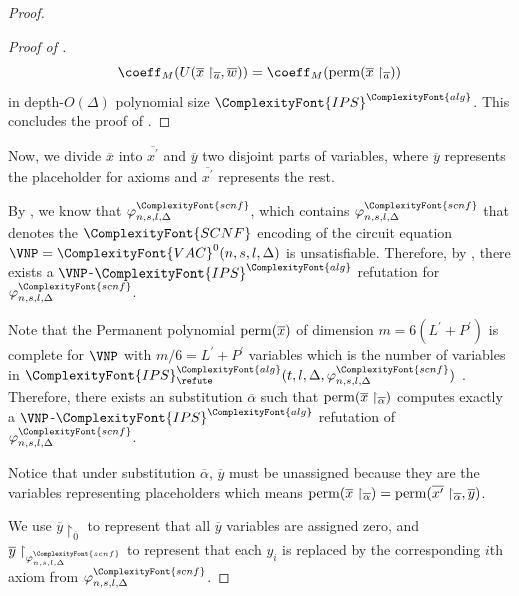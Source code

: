 \documentclass[11pt,letter]{article}
\theoremstyle{remark} %
\newcommand{\perm}{{\rm perm}}
\newcommand{\alg}{\ComplexityFont{alg}}
\newcommand{\IPS}{%
    {
        \ComplexityFont{IPS} 
    }
}
\newcommand{\SCNF}{%
    {
        \ComplexityFont{SCNF}
    }
}
\newcommand{\scnf}{
    {
        \ComplexityFont{scnf}
    }
}
\newcommand{\VAC}{
    {
        \ComplexityFont{VAC}
    }
}
\begin{document}
{\begin{proof}
\begin{proof}[Proof of ]
        \begin{equation}
            \label{equa: final circuit equation}
            \coeff_M(U(\overline{x}\restriction_{\overline{a}}, \overline{w})) = \coeff_M(\perm(\overline{x}\restriction_{\overline{a}}))
        \end{equation}
        in depth-$O(\Delta)$ polynomial size $\IPS^\alg$. This concludes the proof of .
    \end{proof}
    
        \bigskip
        Now, we divide $\overline{x}$ into $\overline{x^\prime}$ and $\overline{y}$ two disjoint parts of variables, where $\overline{y}$ represents the placeholder for axioms and $\overline{x^\prime}$ represents the rest. 
        
        By , we know that $\varphi_{n,s,l,\Delta}^\scnf$, which contains $\varphi_{n,s,l,\Delta}^\scnf$ that denotes the $\SCNF$ encoding of the circuit equation $\VNP=\VAC^0(n,s,l,\Delta)$ is unsatisfiable. Therefore, by , there exists a $\VNP$-$\IPS^\alg$ refutation for $\varphi_{n,s,l,\Delta}^\scnf$.

        Note that the Permanent polynomial $\perm(\overline{x})$ of dimension $m= 6(L^\prime+P^\prime)$ is complete for $\VNP$ with $m/6 = L^\prime+P^\prime$ variables which is the number of variables in $\IPS_\refute^\alg(t,l,\Delta, \varphi_{n,s,l,\Delta}^\scnf)$ \cite{Val79:ComplClass}. Therefore, there exists an substitution $\overline{\alpha}$ such that $\perm(\overline{x}\restriction_{\overline{\alpha}})$ computes exactly a $\VNP$-$\IPS^\alg$ refutation of $\varphi_{n,s,l,\Delta}^\scnf$.
 
        Notice that under substitution $\overline{\alpha}$, $\overline{y}$ must be unassigned because they are the variables representing placeholders which means $\perm(\overline{x}\restriction_{\overline{\alpha}})=\perm(\overline{x^\prime}\restriction_{\overline{\alpha}}, \overline{y})$.
        
        We use $\overline{y}\restriction_{\overline{0}}$ to represent that all $\overline{y}$ variables are assigned zero, and $\overline{y}\restriction_{\varphi_{n,s,l,\Delta}^\scnf}$ to represent that each $y_i$ is replaced by the corresponding $i$th axiom from $\varphi_{n,s,l,\Delta}^\scnf$.


\end{proof}}
\end{document}
